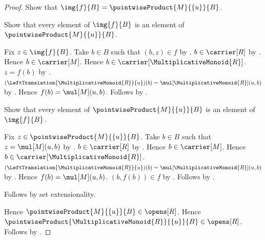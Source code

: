 \begin{proof}
    Show that $\img{f}{B}=\pointwiseProduct{M}{\{u\}}{B}$.
    \begin{subproof}
        Show that every element of $\img{f}{B}$ is an element of
            $\pointwiseProduct{M}{\{u\}}{B}$.
        \begin{subproof}
            Fix $z\in\img{f}{B}$.
            Take $b\in B$ such that $(b,z)\in f$ by .
            $b\in\carrier[R]$ by .
            Hence $b\in\carrier[M]$.
            Hence $b\in\carrier[\MultiplicativeMonoid{R}]$.
            $z=f(b)$ by
                .
            $(\LeftTranslation{\MultiplicativeMonoid{R}}{u})(b)
                =\mul[\MultiplicativeMonoid{R}](u,b)$ by
                .
            Hence $f(b)=\mul[M](u,b)$.
            Follows by
                .
        \end{subproof}
        Show that every element of $\pointwiseProduct{M}{\{u\}}{B}$ is
            an element of $\img{f}{B}$.
        \begin{subproof}
            Fix $z\in\pointwiseProduct{M}{\{u\}}{B}$.
            Take $b\in B$ such that $z=\mul[M](u,b)$ by
                .
            $b\in\carrier[R]$ by .
            Hence $b\in\carrier[M]$.
            Hence $b\in\carrier[\MultiplicativeMonoid{R}]$.
            $(\LeftTranslation{\MultiplicativeMonoid{R}}{u})(b)
                =\mul[\MultiplicativeMonoid{R}](u,b)$ by
                .
            Hence $f(b)=\mul[M](u,b)$.
            $(b,f(b))\in f$ by
                .
            Follows by .
        \end{subproof}
        Follows by set extensionality.
    \end{subproof}
    Hence $\pointwiseProduct{M}{\{u\}}{B}\in\opens[R]$.
    Hence $\pointwiseProduct{\MultiplicativeMonoid{R}}{\{u\}}{B}
        \in\opens[R]$.
    Follows by .
\end{proof}

